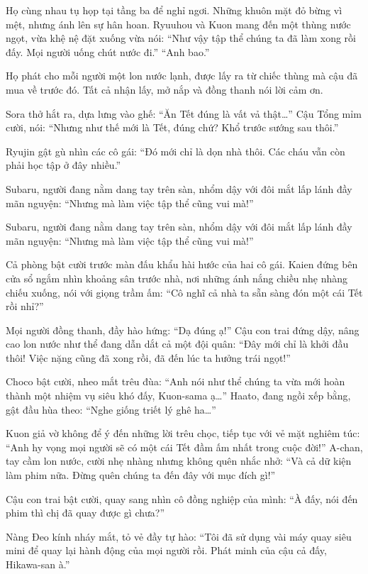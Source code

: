\documentclass[../main.tex]{subfiles}
\begin{document}
Họ cùng nhau tụ họp tại tầng ba để nghỉ ngơi. Những khuôn mặt đỏ bừng vì mệt, nhưng ánh lên sự hân hoan. Ryuuhou và Kuon mang đến một thùng nước ngọt, vừa khệ nệ đặt xuống vừa nói: ``Như vậy tập thể chúng ta đã làm xong rồi đấy. Mọi người uống chút nước đi.'' ``Anh bao.''

Họ phát cho mỗi người một lon nước lạnh, được lấy ra từ chiếc thùng mà cậu đã mua về trước đó. Tất cả nhận lấy, mở nắp và đồng thanh nói lời cảm ơn.

Sora thở hắt ra, dựa lưng vào ghế: ``Ăn Tết đúng là vất vả thật\dots'' Cậu Tổng mỉm cười, nói: ``Nhưng như thế mới là Tết, đúng chứ? Khổ trước sướng sau thôi.''

Ryujin gật gù nhìn các cô gái: ``Đó mới chỉ là dọn nhà thôi. Các cháu vẫn còn phải học tập ở đây nhiều.''

Subaru, người đang nằm dang tay trên sàn, nhổm dậy với đôi mắt lấp lánh đầy mãn nguyện: ``Nhưng mà làm việc tập thể cũng vui mà!''

Subaru, người đang nằm dang tay trên sàn, nhổm dậy với đôi mắt lấp lánh đầy mãn nguyện: ``Nhưng mà làm việc tập thể cũng vui mà!''

Cả phòng bật cười trước màn đấu khẩu hài hước của hai cô gái. Kaien đứng bên cửa sổ ngắm nhìn khoảng sân trước nhà, nơi những ánh nắng chiều nhẹ nhàng chiếu xuống, nói với giọng trầm ấm: ``Cô nghĩ cả nhà ta sẵn sàng đón một cái Tết rồi nhỉ?''

Mọi người đồng thanh, đầy hào hứng: ``Dạ đúng ạ!'' Cậu con trai đứng dậy, nâng cao lon nước như thể đang dẫn dắt cả một đội quân: ``Đây mới chỉ là khởi đầu thôi! Việc nặng cũng đã xong rồi, đã đến lúc ta hưởng trái ngọt!''

Choco bật cười, nheo mắt trêu đùa: ``Anh nói như thể chúng ta vừa mới hoàn thành một nhiệm vụ siêu khó đấy, Kuon-sama ạ\dots'' Haato, đang ngồi xếp bằng, gật đầu hùa theo: ``Nghe giống triết lý ghê ha\dots''

Kuon giả vờ không để ý đến những lời trêu chọc, tiếp tục với vẻ mặt nghiêm túc: ``Anh hy vọng mọi người sẽ có một cái Tết đầm ấm nhất trong cuộc đời!'' A-chan, tay cầm lon nước, cười nhẹ nhàng nhưng không quên nhắc nhở: ``Và cả dữ kiện làm phim nữa. Đừng quên chúng ta đến đây với mục đích gì!''

Cậu con trai bật cười, quay sang nhìn cô đồng nghiệp của mình: ``À đấy, nói đến phim thì chị đã quay được gì chưa?''

Nàng Đeo kính nháy mắt, tỏ vẻ đầy tự hào: ``Tôi đã sử dụng vài máy quay siêu mini để quay lại hành động của mọi người rồi. Phát minh của cậu cả đấy, Hikawa-san à.''
\end{document}
